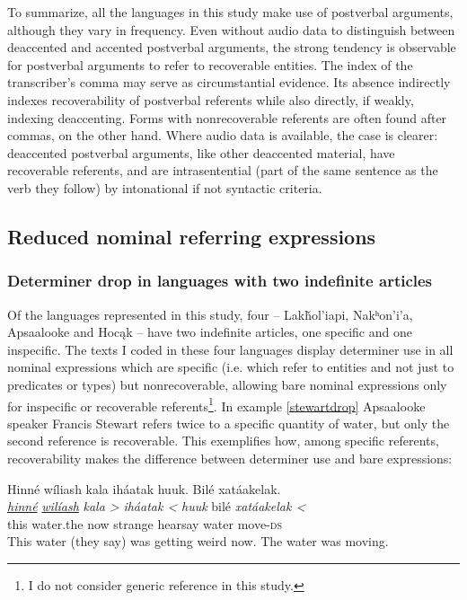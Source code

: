 \documentclass[output=paper]{LSP/langsci}
\begin{document}
To summarize, all the languages in this study make use of postverbal arguments, although they vary in frequency. Even without audio data to distinguish between deaccented and accented postverbal arguments, the strong tendency is observable for postverbal arguments to refer to recoverable entities. The index of the transcriber’s comma may serve as circumstantial evidence. Its absence indirectly indexes recoverability of postverbal referents while also directly, if weakly, indexing deaccenting. Forms with nonrecoverable referents are often found after commas, on the other hand. Where audio data is available, the case is clearer: deaccented postverbal arguments, like other deaccented material, have recoverable referents, and are intrasentential (part of the same sentence as the verb they follow) by intonational if not syntactic criteria.

\subsection{Reduced nominal referring expressions}\label{nominalreduction}

\subsubsection{Determiner drop in languages with two indefinite articles}\label{droptwoindef}

Of the languages represented in this study, four -- Lakȟol’iapi, Nakʰon’i’a, Apsaalooke and Hocąk -- have two indefinite articles, one specific and one inspecific. The texts I coded in these four languages display determiner use in all nominal expressions which are specific (i.e. which refer to entities and not just to predicates or types) but nonrecoverable, allowing bare nominal expressions only for inspecific or recoverable referents\footnote{I do not consider generic reference in this study.}. In example \ref{stewartdrop} Apsaalooke speaker Francis Stewart refers twice to a specific quantity of water, but only the second reference is recoverable. This exemplifies how, among specific referents, recoverability makes the difference between determiner use and bare expressions:

\ea\label{stewartdrop}
Hinné wíliash kala iháatak huuk. Bilé xatáakelak.\footnotemark\\
\gll	\emph{\underline{hinné}} 	\emph{\underline{wilíash}} 		\emph{kala >} 	\emph{iháatak <}		\emph{huuk} 	bilé 		\emph{xatáakelak <}\\
	this 				water.the 					now 			strange 			hearsay 		water		move-\textsc{ds}\\
\glt	This water (they say) was getting weird now. The water was moving.
\z
\end{document}
